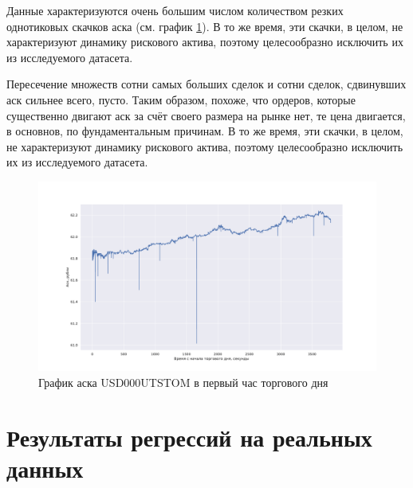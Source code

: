 Данные характеризуются очень большим числом количеством резких однотиковых скачков аска (см. график \ref{askgraph}). 
В то же время, эти скачки, в целом, не характеризуют
динамику рискового актива, поэтому целесообразно исключить их из исследуемого датасета. \par
Пересечение множеств
сотни самых больших сделок и сотни сделок, сдвинувших аск сильнее всего, пусто. Таким образом, похоже, что ордеров,
которые существенно двигают аск за счёт своего размера на рынке нет, те цена двигается, в основнов, по фундаментальным причинам.
В то же время, эти скачки, в целом, не характеризуют
динамику рискового актива, поэтому целесообразно исключить их из исследуемого датасета.
\begin{figure}
    \includegraphics[scale=0.41]{fig/Palki.pdf}
    \caption{График аска USD000UTSTOM в первый час торгового дня}
    \label{askgraph}
\end{figure}


\section{Результаты регрессий на реальных данных}

